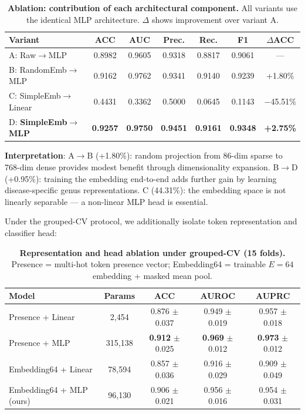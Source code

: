 \documentclass[11pt,a4paper]{article}
\begin{document}
\begin{table}[ht]
\centering
\caption{\textbf{Ablation: contribution of each architectural component.}
All variants use the identical MLP architecture. $\Delta$ shows improvement over variant A.}
\label{tab:ablation}
\begin{tabular}{lcccccc}
\toprule
\textbf{Variant} & \textbf{ACC} & \textbf{AUC} & \textbf{Prec.} & \textbf{Rec.} & \textbf{F1} & \textbf{$\Delta$ACC} \\
\midrule
A: Raw$\rightarrow$MLP & 0.8982 & 0.9605 & 0.9318 & 0.8817 & 0.9061 & --- \\
B: RandomEmb$\rightarrow$MLP & 0.9162 & 0.9762 & 0.9341 & 0.9140 & 0.9239 & +1.80\% \\
C: SimpleEmb$\rightarrow$Linear & 0.4431 & 0.3362 & 0.5000 & 0.0645 & 0.1143 & $-$45.51\% \\
D: \textbf{SimpleEmb$\rightarrow$MLP} & \textbf{0.9257} & \textbf{0.9750} & \textbf{0.9451} & \textbf{0.9161} & \textbf{0.9348} & \textbf{+2.75\%} \\
\bottomrule
\end{tabular}
\end{table}

\textbf{Interpretation}: A$\rightarrow$B (+1.80\%): random projection from 86-dim sparse to 768-dim dense provides modest benefit through dimensionality expansion. B$\rightarrow$D (+0.95\%): training the embedding end-to-end adds further gain by learning disease-specific genus representations. C (44.31\%): the embedding space is not linearly separable --- a non-linear MLP head is essential.

Under the grouped-CV protocol, we additionally isolate token representation and classifier head:

\begin{table}[ht]
\centering
\caption{\textbf{Representation and head ablation under grouped-CV (15 folds).}
Presence = multi-hot token presence vector; Embedding64 = trainable $E{=}64$ embedding + masked mean pool.}
\label{tab:repr_ablation}
\begin{tabular}{lcccc}
\toprule
\textbf{Model} & \textbf{Params} & \textbf{ACC} & \textbf{AUROC} & \textbf{AUPRC} \\
\midrule
Presence + Linear & 2,454 & 0.876 $\pm$ 0.037 & 0.949 $\pm$ 0.019 & 0.957 $\pm$ 0.018 \\
Presence + MLP & 315,138 & \textbf{0.912} $\pm$ 0.025 & \textbf{0.969} $\pm$ 0.012 & \textbf{0.973} $\pm$ 0.012 \\
Embedding64 + Linear & 78,594 & 0.857 $\pm$ 0.036 & 0.916 $\pm$ 0.029 & 0.909 $\pm$ 0.049 \\
Embedding64 + MLP (ours) & 96,130 & 0.906 $\pm$ 0.021 & 0.956 $\pm$ 0.016 & 0.954 $\pm$ 0.031 \\
\bottomrule
\end{tabular}
\end{table}
\end{document}
